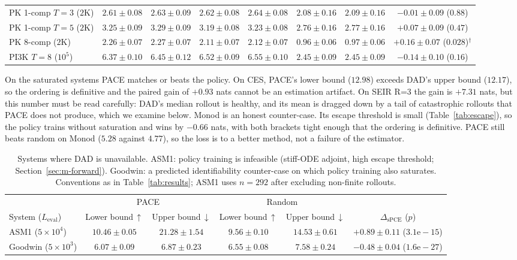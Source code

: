 \begin{table}[t]
\begin{tabular}{lcccccc c}
PK 1-comp $T{=}3$ ($2$K) & $2.61{\pm}0.08$ & $2.63{\pm}0.09$ & $2.62{\pm}0.08$ & $2.64{\pm}0.08$ & $2.08{\pm}0.16$ & $2.09{\pm}0.16$ & $-0.01{\pm}0.09$ ($0.88$) \\
PK 1-comp $T{=}5$ ($2$K) & $3.25{\pm}0.09$ & $3.29{\pm}0.09$ & $3.19{\pm}0.08$ & $3.23{\pm}0.08$ & $2.76{\pm}0.16$ & $2.77{\pm}0.16$ & $+0.07{\pm}0.09$ ($0.47$) \\
PK 8-comp ($2$K)    & $2.26{\pm}0.07$ & $2.27{\pm}0.07$ & $2.11{\pm}0.07$ & $2.12{\pm}0.07$ & $0.96{\pm}0.06$ & $0.97{\pm}0.06$ & $+0.16{\pm}0.07$ ($0.028$)$^\dagger$ \\
PI3K $T{=}8$ ($10^5$) & $6.37{\pm}0.10$ & $6.45{\pm}0.12$ & $6.52{\pm}0.09$ & $6.55{\pm}0.10$ & $2.45{\pm}0.09$ & $2.45{\pm}0.09$ & $-0.14{\pm}0.10$ ($0.16$) \\
\bottomrule
\end{tabular}
\end{table}

On the saturated systems PACE matches or beats the policy. On CES, PACE's lower bound
($12.98$) exceeds DAD's upper bound ($12.17$), so the ordering is definitive and the
paired gain of $+0.93$ nats cannot be an estimation artifact. On SEIR R=3 the gain is
$+7.31$ nats, but this number must be read carefully: DAD's median rollout is healthy,
and its mean is dragged down by a tail of catastrophic rollouts that PACE does not
produce, which we examine below. Monod is an honest counter-case. Its escape threshold
is small (Table~\ref{tab:escape}), so the policy trains without saturation and wins by
$-0.66$ nats, with both brackets tight enough that the ordering is definitive. PACE
still beats random on Monod ($5.28$ against $4.77$), so the loss is to a better method,
not a failure of the estimator.

\begin{table}[t]
\centering\small
\caption[Systems without a DAD comparator]{Systems where DAD is unavailable. ASM1:
policy training is infeasible (stiff-ODE adjoint, high escape threshold;
Section~\ref{sec:m-forward}). Goodwin: a predicted identifiability counter-case on
which policy training also saturates. Conventions as in Table~\ref{tab:results};
ASM1 uses $n=292$ after excluding non-finite rollouts.}
\label{tab:results-rand}
\begin{tabular}{lcccc c}
\toprule
& \multicolumn{2}{c}{PACE} & \multicolumn{2}{c}{Random} & \\
\cmidrule(lr){2-3}\cmidrule(lr){4-5}
System ($L_{\mathrm{eval}}$) & Lower bound\,$\uparrow$ & Upper bound\,$\downarrow$ & Lower bound\,$\uparrow$ & Upper bound\,$\downarrow$ & $\Delta_{\mathrm{sPCE}}$ ($p$) \\
\midrule
ASM1 ($5{\times}10^4$)   & $10.46{\pm}0.05$ & $21.28{\pm}1.54$ & $9.56{\pm}0.10$ & $14.53{\pm}0.61$ & $+0.89{\pm}0.11$ ($3.1\mathrm{e}{-}15$) \\
Goodwin ($5{\times}10^3$) & $6.07{\pm}0.09$ & $6.87{\pm}0.23$ & $6.55{\pm}0.08$ & $7.58{\pm}0.24$ & $-0.48{\pm}0.04$ ($1.6\mathrm{e}{-}27$) \\
\bottomrule
\end{tabular}
\end{table}

